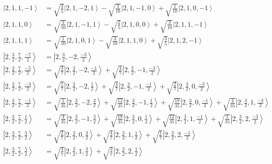 \documentclass{report}
\newcommand{\ket}[1]{\left| #1 \right>} %
\begin{document}
\begin{align*}
\ket{ 2 ,  1 ,  1 ,  -1  } &=  \sqrt{  \frac{3}{5}  } \ket{ 2 ,  1 ,  -2 ,  1  } - \sqrt{  \frac{3}{10}  } \ket{ 2 ,  1 ,  -1 ,  0  } + \sqrt{  \frac{1}{10}  } \ket{ 2 ,  1 ,  0 ,  -1  } \\
\ket{ 2 ,  1 ,  1 ,  0  } &=  \sqrt{  \frac{3}{10}  } \ket{ 2 ,  1 ,  -1 ,  1  } - \sqrt{  \frac{2}{5}  } \ket{ 2 ,  1 ,  0 ,  0  } + \sqrt{  \frac{3}{10}  } \ket{ 2 ,  1 ,  1 ,  -1  } \\
\ket{ 2 ,  1 ,  1 ,  1  } &=  \sqrt{  \frac{1}{10}  } \ket{ 2 ,  1 ,  0 ,  1  } - \sqrt{  \frac{3}{10}  } \ket{ 2 ,  1 ,  1 ,  0  } + \sqrt{  \frac{3}{5}  } \ket{ 2 ,  1 ,  2 ,  -1  } \\
\ket{ 2 ,  \frac{3}{2} ,  \frac{7}{2} ,  \frac{-7}{2}  } &=  \ket{ 2 ,  \frac{3}{2} ,  -2 ,  \frac{-3}{2}  } \\
\ket{ 2 ,  \frac{3}{2} ,  \frac{7}{2} ,  \frac{-5}{2}  } &=  \sqrt{  \frac{3}{7}  } \ket{ 2 ,  \frac{3}{2} ,  -2 ,  \frac{-1}{2}  } + \sqrt{  \frac{4}{7}  } \ket{ 2 ,  \frac{3}{2} ,  -1 ,  \frac{-3}{2}  } \\
\ket{ 2 ,  \frac{3}{2} ,  \frac{7}{2} ,  \frac{-3}{2}  } &=  \sqrt{  \frac{1}{7}  } \ket{ 2 ,  \frac{3}{2} ,  -2 ,  \frac{1}{2}  } + \sqrt{  \frac{4}{7}  } \ket{ 2 ,  \frac{3}{2} ,  -1 ,  \frac{-1}{2}  } + \sqrt{  \frac{2}{7}  } \ket{ 2 ,  \frac{3}{2} ,  0 ,  \frac{-3}{2}  } \\
\ket{ 2 ,  \frac{3}{2} ,  \frac{7}{2} ,  \frac{-1}{2}  } &=  \sqrt{  \frac{1}{35}  } \ket{ 2 ,  \frac{3}{2} ,  -2 ,  \frac{3}{2}  } + \sqrt{  \frac{12}{35}  } \ket{ 2 ,  \frac{3}{2} ,  -1 ,  \frac{1}{2}  } + \sqrt{  \frac{18}{35}  } \ket{ 2 ,  \frac{3}{2} ,  0 ,  \frac{-1}{2}  } + \sqrt{  \frac{4}{35}  } \ket{ 2 ,  \frac{3}{2} ,  1 ,  \frac{-3}{2}  } \\
\ket{ 2 ,  \frac{3}{2} ,  \frac{7}{2} ,  \frac{1}{2}  } &=  \sqrt{  \frac{4}{35}  } \ket{ 2 ,  \frac{3}{2} ,  -1 ,  \frac{3}{2}  } + \sqrt{  \frac{18}{35}  } \ket{ 2 ,  \frac{3}{2} ,  0 ,  \frac{1}{2}  } + \sqrt{  \frac{12}{35}  } \ket{ 2 ,  \frac{3}{2} ,  1 ,  \frac{-1}{2}  } + \sqrt{  \frac{1}{35}  } \ket{ 2 ,  \frac{3}{2} ,  2 ,  \frac{-3}{2}  } \\
\ket{ 2 ,  \frac{3}{2} ,  \frac{7}{2} ,  \frac{3}{2}  } &=  \sqrt{  \frac{2}{7}  } \ket{ 2 ,  \frac{3}{2} ,  0 ,  \frac{3}{2}  } + \sqrt{  \frac{4}{7}  } \ket{ 2 ,  \frac{3}{2} ,  1 ,  \frac{1}{2}  } + \sqrt{  \frac{1}{7}  } \ket{ 2 ,  \frac{3}{2} ,  2 ,  \frac{-1}{2}  } \\
\ket{ 2 ,  \frac{3}{2} ,  \frac{7}{2} ,  \frac{5}{2}  } &=  \sqrt{  \frac{4}{7}  } \ket{ 2 ,  \frac{3}{2} ,  1 ,  \frac{3}{2}  } + \sqrt{  \frac{3}{7}  } \ket{ 2 ,  \frac{3}{2} ,  2 ,  \frac{1}{2}  } \\

\end{align*}
\end{document}
